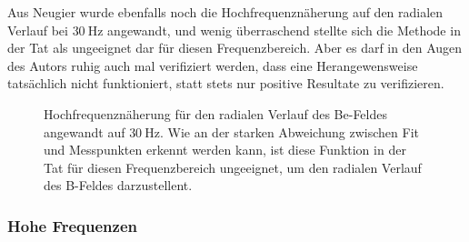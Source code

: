 Aus Neugier wurde  ebenfalls noch die Hochfrequenzn\"aherung  auf den radialen
Verlauf bei $\SI{30}{\hertz}$ angewandt, und wenig \"uberraschend stellte sich
die Methode in  der Tat als ungeeignet dar  f\"ur diesen Frequenzbereich. Aber
es darf in den  Augen des Autors ruhig auch mal  verifiziert werden, dass eine
Herangewensweise tats\"achlich  nicht funktioniert,  statt stets  nur positive
Resultate zu verifizieren.

\begin{figure}[h!]
    \resizebox{\textwidth}{!}{}
    \caption{%
        Hochfrequenzn\"aherung  f\"ur  den   radialen  Verlauf  des  Be-Feldes
        angewandt  auf   $\SI{30}{\hertz}$. Wie  an  der   starken  Abweichung
        zwischen Fit und  Messpunkten erkennt werden kann,  ist diese Funktion
        in der  Tat f\"ur diesen  Frequenzbereich ungeeignet, um  den radialen
        Verlauf des B-Feldes darzustellent.
    }
    \label{fig:alu:rad:approx:low}
\end{figure}


\clearpage
\subsubsection{Hohe Frequenzen}
\label{sec:ausw:subsec:vollz:subsubsec:highfreq}

